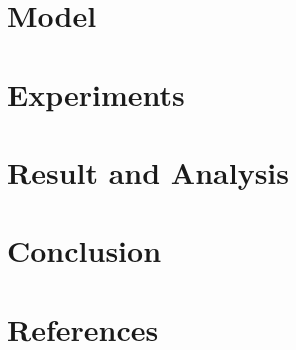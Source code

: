 \documentclass[11pt, oneside, twocolumn]{article}   	%
\begin{document}
\section{Model}
\section{Experiments}
\section{Result and Analysis}
\section{Conclusion}
\section{References}
\end{document}
